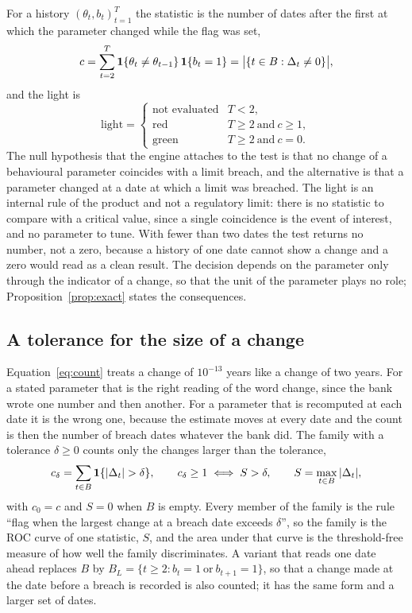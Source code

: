 For a history $(\theta_t,b_t)_{t=1}^{T}$ the statistic is the number of dates after the first at which the parameter changed while the flag was set,
\begin{equation}
c=\sum_{t=2}^{T}\mathbf{1}\{\theta_t\ne\theta_{t-1}\}\,\mathbf{1}\{b_t=1\}=\bigl|\{t\in B:\Delta_t\ne 0\}\bigr|,
\label{eq:count}
\end{equation}
and the light is
\begin{equation}
\mathrm{light}=\begin{cases}\text{not evaluated}&T<2,\\ \text{red}&T\ge 2\ \text{and}\ c\ge 1,\\ \text{green}&T\ge 2\ \text{and}\ c=0.\end{cases}
\label{eq:light}
\end{equation}
The null hypothesis that the engine attaches to the test is that no change of a behavioural parameter coincides with a limit breach, and the alternative is that a parameter changed at a date at which a limit was breached. The light is an internal rule of the product and not a regulatory limit: there is no statistic to compare with a critical value, since a single coincidence is the event of interest, and no parameter to tune. With fewer than two dates the test returns no number, not a zero, because a history of one date cannot show a change and a zero would read as a clean result. The decision depends on the parameter only through the indicator of a change, so that the unit of the parameter plays no role; Proposition~\ref{prop:exact} states the consequences.

\subsection{A tolerance for the size of a change}
\label{sec:method-tolerance}

Equation~\eqref{eq:count} treats a change of $10^{-13}$ years like a change of two years. For a stated parameter that is the right reading of the word change, since the bank wrote one number and then another. For a parameter that is recomputed at each date it is the wrong one, because the estimate moves at every date and the count is then the number of breach dates whatever the bank did. The family with a tolerance $\delta\ge 0$ counts only the changes larger than the tolerance,
\begin{equation}
c_\delta=\sum_{t\in B}\indic\{|\Delta_t|>\delta\},\qquad c_\delta\ge 1\iff S>\delta,\qquad S=\max_{t\in B}|\Delta_t|,
\label{eq:tolerance}
\end{equation}
with $c_0=c$ and $S=0$ when $B$ is empty. Every member of the family is the rule ``flag when the largest change at a breach date exceeds $\delta$'', so the family is the ROC curve of one statistic, $S$, and the area under that curve is the threshold-free measure of how well the family discriminates. A variant that reads one date ahead replaces $B$ by $B_L=\{t\ge 2: b_t=1\ \text{or}\ b_{t+1}=1\}$, so that a change made at the date before a breach is recorded is also counted; it has the same form and a larger set of dates.

